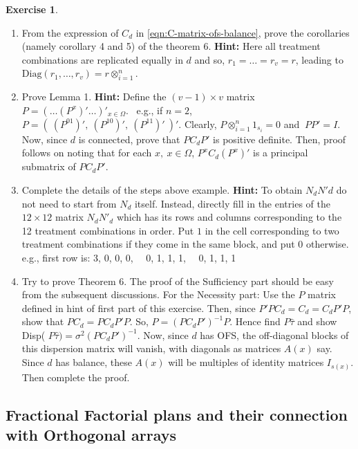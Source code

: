 \documentclass[12pt]{article}
\theoremstyle{definition}
\newtheorem{ex}{Exercise}
\newenvironment{exercise}{
\begin{tcolorbox}[colback=red!5!white,colframe=red!75!black, parbox = false]\begin{ex} }{\end{ex}\end{tcolorbox} }
\begin{document}
\begin{exercise}
    \begin{enumerate}
        \item From the expression of $C_d$ in \eqref{eqn:C-matrix-ofs-balance}, prove the corollaries (namely corollary 4 and 5) of the theorem 6. 
        \textbf{Hint:} Here all treatment combinations are replicated equally in $d$ and so, $r_1=\ldots=r_v=r$, leading to  $\mbox{Diag}(r_1, \ldots, r_v)= r\otimes_{i=1}^n$.
        
        \item Prove Lemma 1. 
        \textbf{Hint:} Define the $(v-1)\times v$ matrix $P = (\ldots (P^x)' \ldots )'_{x \in \Omega}.$  \  e.g.,  if $n=2$, $P= ( \ (P^{01})', \ (P^{10})',  \ (P^{11})' \ )'.$  Clearly, $P\otimes_{i=1}^n1_{s_i} =0$ and $ \ PP'= I $. Now, since $d$ is connected, prove that $PC_dP'$ is positive definite. Then, proof follows on noting that for each $x, \  x\in \Omega$, $P^x C_d (P^x)'$ is a principal submatrix of $PC_dP'$.

	    \item  Complete the details of the steps above example. 
	    \textbf{Hint: } To obtain $N_dN'd$ do not need to start from $N_d$ itself. Instead, directly fill in the entries of the $ 12 \times 12$  matrix $N_dN'_d$ which has its  rows and columns corresponding to the 12 treatment combinations in order.  Put $1$ in the cell corresponding to two treatment combinations  if they come in the same block, and put $0$ otherwise. e.g., first row is: 
	        3, 0, 0, 0, \  \ 0, 1, 1, 1, \ \ 0, 1, 1, 1 \

	\item Try to prove Theorem 6. The proof of the Sufficiency part should be easy from the subsequent discussions.
	For the Necessity part: Use the $P$ matrix defined in hint of first part of this exercise. Then, since $P'PC_d = C_d = C_dP'P$, show that $PC_d = PC_dP'  P$. 
	So, $P = (PC_dP')^{-1}P$. Hence find  $P\hat{\tau}$ and show  Disp( $P\hat{\tau}) = \sigma^2 (PC_dP')^{-1}.$  Now, since $d$ has OFS, the off-diagonal blocks of this dispersion matrix will vanish, with diagonals as matrices $A(x)$ say. Since $d$ has balance, these $A(x)$ will be multiples of identity matrices $I_{s(x)}$. Then complete the proof.
    \end{enumerate}
\end{exercise}


\subsection{Fractional Factorial plans and their connection with Orthogonal arrays}
\end{document}
